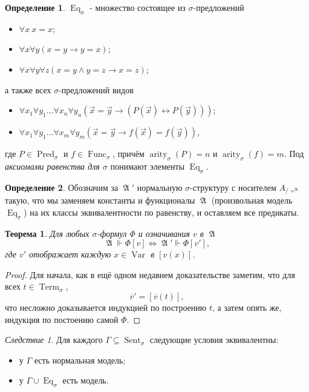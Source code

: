 \documentclass[a4paper,100pt]{article}
\theoremstyle{indented}
\newtheorem{theorem}{Теорема}
\theoremstyle{definition}
\newtheorem{defn}{Определение}
\theoremstyle{remark}
\newtheorem{cons}{Следствие}
\DeclareMathOperator{\ra}{\rightarrow}
\DeclareMathOperator{\Llra}{\Longleftrightarrow}
\DeclareMathOperator{\Pred}{Pred}
\DeclareMathOperator{\Func}{Func}
\DeclareMathOperator{\arity}{arity}
\DeclareMathOperator{\Var}{Var}
\DeclareMathOperator{\Term}{Term}
\DeclareMathOperator{\Sent}{Sent}
\DeclareMathOperator{\Eq}{Eq}
\DeclareMathOperator{\GA}{\mathfrak{A}}
\begin{document}
\begin{defn}
  $\Eq_\sigma$ - множество состоящее из $\sigma$-предложений

  \begin{itemize}
    \item $\forall x \: x=x$; 
    \item $\forall x \forall y (x=y\ra y=x)$; 
    \item $\forall x \forall y \forall z (x=y \wedge y=z \ra x=z)$;
  \end{itemize}
  а также всех $\sigma$-предложений видов 

  \begin{itemize}
    \item $\forall x_1 \forall y_1 \ldots \forall x_n \forall y_n (\vec{x}=\vec{y}\ra (P(\vec{x})\leftrightarrow P(\vec{y})))$; 
    \item $\forall x_1 \forall y_1 \ldots \forall x_m \forall y_m (\vec{x}=\vec{y}\ra f(\vec{x}) = f(\vec{y}))$, 
  \end{itemize}
  где $P\in \Pred_\sigma$ и $f\in \Func_\sigma$, причём $\arity_\sigma(P)=n$ и $\arity_\sigma(f)=m$. Под \textit{аксиомами равенства для $\sigma$} понимают элементы $\Eq_\sigma$. 
\end{defn}

\begin{defn}
  Обозначим за $\GA'$ нормальную $\sigma$-структуру с носителем $A_{/=^{\GA}}$ такую, что мы заменяем константы и функционалы $\GA$ (произвольная модель $\Eq_\sigma$) на их классы эквивалентности по равенству, и оставляем все предикаты.
\end{defn}

\begin{theorem}
  Для любых $\sigma$-формул $\Phi$ и означивания $v$ в $\GA$ 
  \[
    \GA \Vdash \Phi[v] \Llra \GA'\Vdash \Phi[v'], 
  \]
  где $v'$ отображает каждую $x\in \Var$ в $[v(x)]$. 
\end{theorem}

\begin{proof}
  Для начала, как в ещё одном недавнем доказательстве заметим, что для всех $t\in \Term_\sigma$, 
  \[
    \overline{v}'=[\overline{v}(t)],
  \]
  что несложно доказывается индукцией по построению $t$, а затем опять же, индукция по постоению самой $\Phi$. 
\end{proof}

\begin{cons}
  Для каждого $\Gamma\subseteq \Sent_\sigma$ следующие условия эквивалентны: 

  \begin{itemize}
    \item у $\Gamma$ есть нормальная модель; 
    \item у $\Gamma \cup \Eq_\sigma$ есть модель.
  \end{itemize}
\end{cons}
\end{document}

